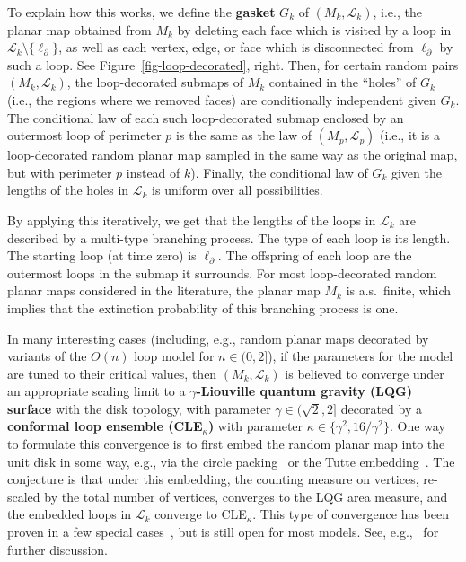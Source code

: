 \documentclass[11pt]{article}
\theoremstyle{plain}
\theoremstyle{definition}
\numberwithin{equation}{section}
\newcommand{\mcl}{\mathcal}
\newcommand{\bdy}{\partial}
\begin{document}
To explain how this works, we define the \textbf{gasket} $G_k$ of $(M_k,\mcl L_k)$, i.e., the planar map obtained from $M_k$ by deleting each face which is visited by a loop in $\mcl L_k \setminus \{\ell_\bdy\}$, as well as each vertex, edge, or face which is disconnected from $\ell_\bdy$ by such a loop. See Figure~\ref{fig-loop-decorated}, right.  
Then, for certain random pairs $(M_k,\mcl L_k)$, the loop-decorated submaps of $M_k$ contained in the ``holes'' of $G_k$ (i.e., the regions where we removed faces) are conditionally independent given $G_k$. The conditional law of each such loop-decorated submap enclosed by an outermost loop of perimeter $p$ is the same as the law of $(M_p , \mcl L_p)$ (i.e., it is a loop-decorated random planar map sampled in the same way as the original map, but with perimeter $p$ instead of $k$). Finally, the conditional law of $G_k$ given the lengths of the holes in $\mcl L_k$ is uniform over all possibilities. 

By applying this iteratively, we get that the lengths of the loops in $\mcl L_k$ are described by a multi-type branching process. The type of each loop is its length. The starting loop (at time zero) is $\ell_\bdy$. The offspring of each loop are the outermost loops in the submap it surrounds. 
For most loop-decorated random planar maps considered in the literature, the planar map $M_k$ is a.s.\ finite, which implies that the extinction probability of this branching process is one. 

In many interesting cases (including, e.g., random planar maps decorated by variants of the $O(n)$ loop model for $n\in (0,2]$), if the parameters for the model are tuned to their critical values, then $(M_k,\mcl L_k)$ is believed to converge under an appropriate scaling limit to a \textbf{$\gamma$-Liouville quantum gravity (LQG) surface} with the disk topology, with parameter $\gamma \in (\sqrt{2},2]$ decorated by a \textbf{conformal loop ensemble (CLE$_\kappa$)} with parameter $\kappa \in \{\gamma^2,16/\gamma^2\}$. One way to formulate this convergence is to first embed the random planar map into the unit disk in some way, e.g., via the circle packing~\cite{nachmias-circle-packing} or the Tutte embedding~\cite{gms-tutte}. The conjecture is that under this embedding, the counting measure on vertices, re-scaled by the total number of vertices, converges to the LQG area measure, and the embedded loops in $\mcl L_k$ converge to CLE$_\kappa$. This type of convergence has been proven in a few special cases~\cite{gms-tutte,hs-cardy-embedding}, but is still open for most models. See, e.g.,~\cite[Section 4]{bp-lqg-notes} for further discussion.
\end{document}
